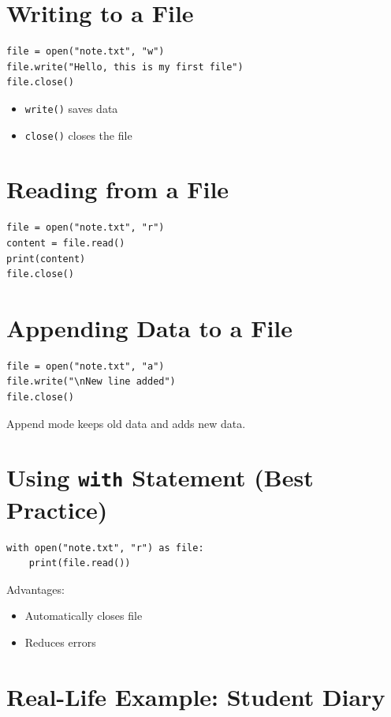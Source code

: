 \section{Writing to a File}

\begin{verbatim}
file = open("note.txt", "w")
file.write("Hello, this is my first file")
file.close()
\end{verbatim}

\begin{itemize}
    \item \texttt{write()} saves data
    \item \texttt{close()} closes the file
\end{itemize}

\section{Reading from a File}

\begin{verbatim}
file = open("note.txt", "r")
content = file.read()
print(content)
file.close()
\end{verbatim}

\section{Appending Data to a File}

\begin{verbatim}
file = open("note.txt", "a")
file.write("\nNew line added")
file.close()
\end{verbatim}

Append mode keeps old data and adds new data.

\section{Using \texttt{with} Statement (Best Practice)}

\begin{verbatim}
with open("note.txt", "r") as file:
    print(file.read())
\end{verbatim}

Advantages:
\begin{itemize}
    \item Automatically closes file
    \item Reduces errors
\end{itemize}

\section{Real-Life Example: Student Diary}

